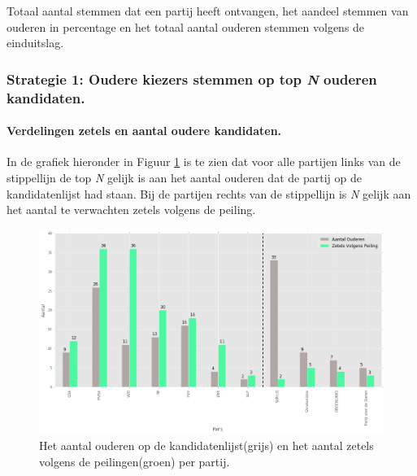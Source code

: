 \begin{table}[h]
\centering
	\begin{footnotesize}
		
	\end{footnotesize}
			\caption{Totaal aantal stemmen dat een partij heeft ontvangen, het aandeel stemmen van ouderen in percentage en het totaal aantal ouderen stemmen volgens de einduitslag.}
\label{table:tab2O} 
\end{table}
    

\subsubsection{Strategie 1: Oudere kiezers stemmen op top \textit{N} ouderen kandidaten.} 

 
\paragraph{Verdelingen zetels en aantal oudere kandidaten.}
In de grafiek hieronder in Figuur \ref{fig:zetelsO} is te zien dat voor alle partijen links van de stippellijn de top \textit{N} gelijk is aan het aantal ouderen dat de partij op de kandidatenlijst had staan. Bij de partijen rechts van de stippellijn is \textit{N} gelijk aan het aantal te verwachten zetels volgens de peiling. 

 
\begin{figure}[H]

	\includegraphics[width=0.98\linewidth]	{Aantal_ouderen_aantal_zetels1.png}

			\caption{Het aantal ouderen op de kandidatenlijst(grijs) en het aantal zetels volgens de peilingen(groen) per partij.}

\label{fig:zetelsO}
\end{figure}

